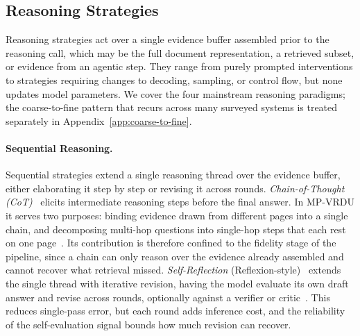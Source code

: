 \documentclass[11pt]{article}
\begin{document}
\subsection{Reasoning Strategies}
\label{sec:tf-reasoning}
Reasoning strategies act over a single evidence buffer assembled prior to the reasoning call, which may be the full document representation, a retrieved subset, or evidence from an agentic step. They range from purely prompted interventions to strategies requiring changes to decoding, sampling, or control flow, but none updates model parameters. We cover the four mainstream reasoning paradigms; the coarse-to-fine pattern that recurs across many surveyed systems is treated separately in Appendix~\ref{app:coarse-to-fine}.

\paragraph{Sequential Reasoning.}
Sequential strategies extend a single reasoning thread over the evidence buffer, either elaborating it step by step or revising it across rounds. \emph{Chain-of-Thought (CoT)}~\cite{wei2022chain} elicits intermediate reasoning steps before the final answer. In MP-VRDU it serves two purposes: binding evidence drawn from different pages into a single chain, and decomposing multi-hop questions into single-hop steps that each rest on one page~\cite{jia2024leopard, xu2026mmr5}. Its contribution is therefore confined to the fidelity stage of the pipeline, since a chain can only reason over the evidence already assembled and cannot recover what retrieval missed. \emph{Self-Reflection} (Reflexion-style)~\cite{shinn2023reflexion} extends the single thread with iterative revision, having the model evaluate its own draft answer and revise across rounds, optionally against a verifier or critic~\cite{jain2025simpledoc, wang2025vidorag}. This reduces single-pass error, but each round adds inference cost, and the reliability of the self-evaluation signal bounds how much revision can recover.
\end{document}
